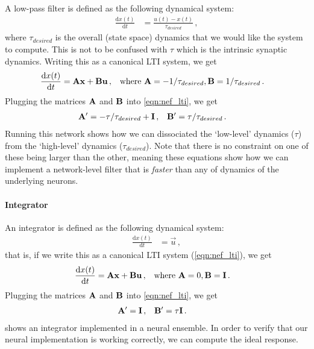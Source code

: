 \documentclass[10pt,letterpaper,oneside]{article}
\begin{document}
A low-pass filter is defined as the following dynamical system:
\begin{align*}
	\frac{\mathrm{d} x(t)}{\mathrm{d}t} &= \frac {u(t)-x(t)}{\tau_{desired}} \,,
\end{align*}
where $\tau_{desired}$ is the overall (state space) dynamics that we would like the system to compute. This is not to be confused with $\tau$ which is the intrinsic synaptic dynamics. Writing this as a canonical LTI system, we get
\begin{align*}
	\frac{\mathrm{d} x(t)}{\mathrm{d}t} &= {\mathbf{A}} {\mathbf{x}} + {\mathbf{B}} {\mathbf{u}} \,, && \text{where } {\mathbf{A}} = -1/\tau_{desired}, {\mathbf{B}} = 1/\tau_{desired} \,.
\end{align*}
Plugging the matrices ${\mathbf{A}}$ and ${\mathbf{B}}$ into \cref{eqn:nef_lti}, we get
\begin{align*}
	{\mathbf{A}}' &= -\tau/\tau_{desired} + {\mathbf{I}} \,, & {\mathbf{B}}' &= \tau/\tau_{desired} \,.
\end{align*}
Running this network shows how we can dissociated the `low-level' dynamics ($\tau$) from the `high-level' dynamics ($\tau_{desired}$). Note that there is no constraint on one of these being larger than the other, meaning these equations show how we can implement a network-level filter  that is \emph{faster} than any of dynamics of the underlying neurons.

\paragraph{Integrator}

An integrator is defined as the following dynamical system:
\begin{align*}
	\frac{\mathrm{d} x(t)}{\mathrm{d}t} &= \vec u \,,
\end{align*}
that is, if we write this as a canonical LTI system (\cref{eqn:nef_lti}), we get
\begin{align*}
	\frac{\mathrm{d} x(t)}{\mathrm{d}t} &= {\mathbf{A}} {\mathbf{x}} + {\mathbf{B}} {\mathbf{u}} \,, && \text{where } {\mathbf{A}} = 0, {\mathbf{B}} = {\mathbf{I}} \,.
\end{align*}
Plugging the matrices ${\mathbf{A}}$ and ${\mathbf{B}}$ into \cref{eqn:nef_lti}, we get
\begin{align*}
	{\mathbf{A}}' &= {\mathbf{I}} \,, & {\mathbf{B}}' &= \tau {\mathbf{I}} \,.
\end{align*}
 shows an integrator implemented in a neural ensemble. In order to verify that our neural implementation is working correctly, we can compute the ideal response.
\end{document}
